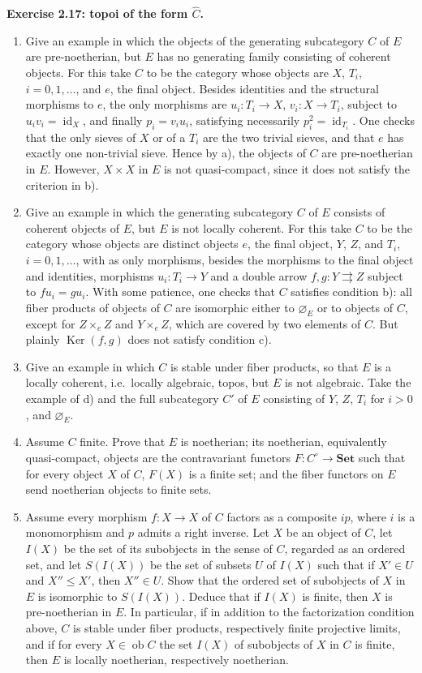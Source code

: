 \documentclass[11pt]{article}
\newcommand{\Set}{\mathbf{Set}}
\newcommand{\ob}{\operatorname{ob}}
\newcommand{\id}{\operatorname{id}}
\newcommand{\Ker}{\operatorname{Ker}}
\newcommand{\ie}{i.e.\ }
\newenvironment{remarktext}[1]{\par\medskip\noindent\textbf{#1.}\ }{\par\medskip}
\begin{document}
\begin{remarktext}{Exercise 2.17: topoi of the form \(\widehat C\)}
\begin{enumerate}[label=\alph*)]
\item Give an example in which the objects of the generating subcategory \(C\) of \(E\) are pre-noetherian, but \(E\) has no generating family consisting of coherent objects. For this take \(C\) to be the category whose objects are \(X\), \(T_i\), \(i=0,1,\ldots\), and \(e\), the final object. Besides identities and the structural morphisms to \(e\), the only morphisms are \(u_i:T_i\to X\), \(v_i:X\to T_i\), subject to \(u_iv_i=\id_X\), and finally \(p_i=v_iu_i\), satisfying necessarily \(p_i^2=\id_{T_i}\). One checks that the only sieves of \(X\) or of a \(T_i\) are the two trivial sieves, and that \(e\) has exactly one non-trivial sieve. Hence by a), the objects of \(C\) are pre-noetherian in \(E\). However, \(X\times X\) in \(E\) is not quasi-compact, since it does not satisfy the criterion in b).
\item Give an example in which the generating subcategory \(C\) of \(E\) consists of coherent objects of \(E\), but \(E\) is not locally coherent. For this take \(C\) to be the category whose objects are distinct objects \(e\), the final object, \(Y\), \(Z\), and \(T_i\), \(i=0,1,\ldots\), with as only morphisms, besides the morphisms to the final object and identities, morphisms \(u_i:T_i\to Y\) and a double arrow \(f,g:Y\rightrightarrows Z\) subject to \(fu_i=gu_i\). With some patience, one checks that \(C\) satisfies condition b): all fiber products of objects of \(C\) are isomorphic either to \(\varnothing_E\) or to objects of \(C\), except for \(Z\times_e Z\) and \(Y\times_e Z\), which are covered by two elements of \(C\). But plainly \(\Ker(f,g)\) does not satisfy condition c).
\item Give an example in which \(C\) is stable under fiber products, so that \(E\) is a locally coherent, \ie locally algebraic, topos, but \(E\) is not algebraic. Take the example of d) and the full subcategory \(C'\) of \(E\) consisting of \(Y\), \(Z\), \(T_i\) for \(i>0\), and \(\varnothing_E\).
\item Assume \(C\) finite. Prove that \(E\) is noetherian; its noetherian, equivalently quasi-compact, objects are the contravariant functors \(F:C^\circ\to\Set\) such that for every object \(X\) of \(C\), \(F(X)\) is a finite set; and the fiber functors on \(E\) send noetherian objects to finite sets.
\item Assume every morphism \(f:X\to X\) of \(C\) factors as a composite \(ip\), where \(i\) is a monomorphism and \(p\) admits a right inverse. Let \(X\) be an object of \(C\), let \(I(X)\) be the set of its subobjects in the sense of \(C\), regarded as an ordered set, and let \(S(I(X))\) be the set of subsets \(U\) of \(I(X)\) such that if \(X'\in U\) and \(X''\leq X'\), then \(X''\in U\). Show that the ordered set of subobjects of \(X\) in \(E\) is isomorphic to \(S(I(X))\). Deduce that if \(I(X)\) is finite, then \(X\) is pre-noetherian in \(E\). In particular, if in addition to the factorization condition above, \(C\) is stable under fiber products, respectively finite projective limits, and if for every \(X\in\ob C\) the set \(I(X)\) of subobjects of \(X\) in \(C\) is finite, then \(E\) is locally noetherian, respectively noetherian.

\end{enumerate}
\end{remarktext}
\end{document}
